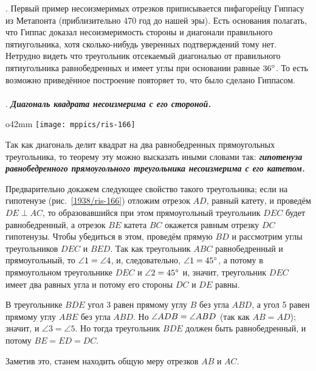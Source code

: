 \smallskip
{.}
Первый пример несоизмеримых отрезков приписывается пифагорейцу Гиппасу из Метапонта (приблизительно 470 год до нашей эры).
Есть основания полагать, что Гиппас доказал несоизмеримость стороны и диагонали правильного пятиугольника, хотя сколько-нибудь уверенных подтверждений тому нет.
Нетрудно видеть что треугольник отсекаемый диагональю от правильного пятиугольника равнобедренных и имеет углы при основании равные $36\degree$.
То есть возможно приведённое построение повторяет то, что было сделано Гиппасом.


\paragraph{}\label{1938/149}
.
\textbf{\emph{Диагональ квадрата несоизмерима с его стороной.}}

\begin{wrapfigure}{o}{42mm}
\centering
\texttt{[image: mppics/ris-166]}
\caption{}\label{1938/ris-166}
\end{wrapfigure}

Так как диагональ делит квадрат на два равнобедренных прямоугольных треугольника, то теорему эту можно высказать иными словами так:
\textbf{\emph{гипотенуза равнобедренного прямоугольного треугольника несоизмерима с его катетом.}}

Предварительно докажем следующее свойство такого треугольника;
если на гипотенузе (рис.~\ref{1938/ris-166}) отложим отрезок $AD$, равный катету, и проведём $DE\perp AC$, то образовавшийся при этом прямоугольный треугольник $DEC$ будет равнобедренный, а отрезок $BE$ катета $BC$ окажется равным отрезку $DC$ гипотенузы.
Чтобы убедиться в этом, проведём прямую $BD$ и рассмотрим углы треугольников $DEC$ и $BED$.
Так как треугольник $ABC$ равнобедренный и прямоугольный, то $\angle 1 \z= \angle 4$, и, следовательно, $\angle 1 \z= 45\degree$, а потому в прямоугольном треугольнике $DEC$ и $\angle 2 = 45\degree$ и, значит, треугольник $DEC$ имеет два равных угла и потому его стороны $DC$ и $DE$ равны.



В треугольнике $BDE$ угол 3 равен прямому углу $B$ без угла $ABD$, а угол 5 равен прямому углу $ABE$ без угла $ABD$.
Но $\angle ADB \z= \angle ABD$ (так как $AB=AD$);
значит, и $\angle 3 = \angle 5$.
Но тогда треугольник $BDE$ должен быть равнобедренный, и потому $BE=ED=DC$.

Заметив это, станем находить общую меру отрезков $AB$ и $AC$.

